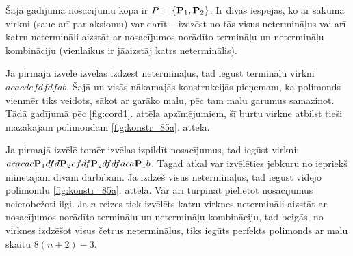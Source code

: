 \documentclass[utf8]{ludis2022}
\begin{document}
\vspace{10pt}

Šajā gadījumā nosacījumu kopa ir $P=\{ {\bf{P}}_1, {\bf{P}}_2\}$. Ir divas iespējas, ko ar sākuma virkni (sauc arī par aksiomu)  var darīt -- izdzēst no tās visus netermināļus vai arī katru netermināli aizstāt ar nosacījumos norādīto termināļu un netermināļu kombināciju (vienlaikus ir jāaizstāj katrs neterminālis).

Ja pirmajā izvēlē izvēlas izdzēst netermināļus, tad iegūst termināļu virkni $acacdefdfdfab$. Šajā un visās nākamajās konstrukcijās pieņemam, ka polimonds vienmēr tiks veidots, sākot ar garāko malu, pēc tam malu garumus samazinot. Tādā gadījumā pēc \ref{fig:cord1}. attēla apzīmējumiem, šī burtu virkne atbilst tieši mazākajam polimondam \ref{fig:konstr_85a}. attēlā.

Ja pirmajā izvēlē tomēr izvēlas izpildīt nosacījumus, tad iegūst virkni: $acacac {\bf{P}}_1 dfd {\bf{P}}_2 efdf {\bf{P}}_2 dfdfaca {\bf{P}}_1 b$. Tagad atkal var izvēlēties jebkuru no iepriekš minētajām divām darbībām. Ja izdzēš visus netermināļus, tad iegūst vidējo polimondu \ref{fig:konstr_85a}. attēlā. Var arī turpināt pielietot nosacījumus neierobežoti ilgi. Ja $n$ reizes tiek izvēlēts katru virknes netermināli aizstāt ar nosacījumos norādīto termināļu un netermināļu kombināciju, tad beigās, no virknes izdzēšot visus četrus netermināļus, tiks iegūts perfekts polimonds ar malu skaitu $8(n+2)-3$.
\end{document}
